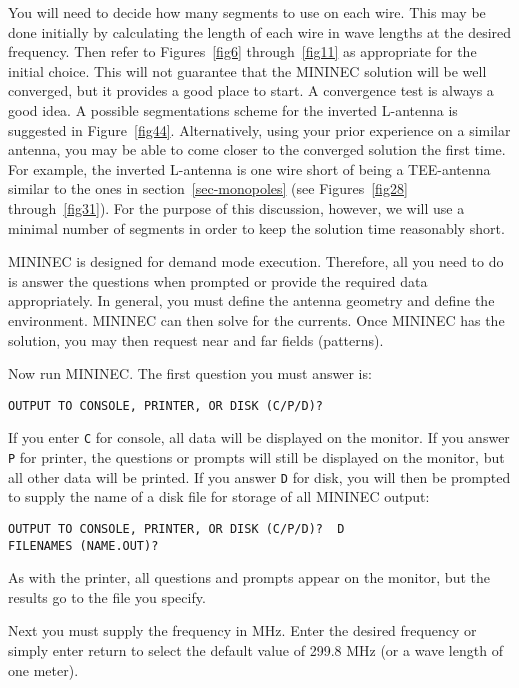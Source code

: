 \documentclass[12pt]{article}
\begin{document}
You will need to decide how many segments to use on each wire. This may
be done initially by calculating the length of each wire in wave lengths
at the desired frequency. Then refer to Figures~\ref{fig6}
through~\ref{fig11} as appropriate for the initial choice. This will not
guarantee that the MININEC solution will be well converged, but it
provides a good place to start. A convergence test is always a good
idea. A possible segmentations scheme for the inverted L-antenna is
suggested in Figure~\ref{fig44}. Alternatively, using your prior
experience on a similar antenna, you may be able to come closer to the
converged solution the first time. For example, the inverted L-antenna
is one wire short of being a TEE-antenna similar to the ones in
section~\ref{sec-monopoles} (see Figures~\ref{fig28} through~\ref{fig31}).
For the purpose of this discussion, however, we will use a minimal
number of segments in order to keep the solution time reasonably short.

MININEC is designed for demand mode execution. Therefore, all you need
to do is answer the questions when prompted or provide the required data
appropriately. In general, you must define the antenna geometry and
define the environment. MININEC can then solve for the currents. Once
MININEC has the solution, you may then request near and far fields
(patterns).

\noindent Now run MININEC. The first question you must answer is:

\begin{Verbatim}
OUTPUT TO CONSOLE, PRINTER, OR DISK (C/P/D)?
\end{Verbatim}

If you enter \verb+C+ for console, all data will be displayed on the
monitor. If you answer \verb+P+ for printer, the questions or prompts
will still be displayed on the monitor, but all other data will be
printed. If you answer \verb+D+ for disk, you will then be prompted to
supply the name of a disk file for storage of all MININEC output:

\begin{Verbatim}
OUTPUT TO CONSOLE, PRINTER, OR DISK (C/P/D)?  D
FILENAMES (NAME.OUT)?
\end{Verbatim}

As with the printer, all questions and prompts appear on the monitor,
but the results go to the file you specify.

Next you must supply the frequency in MHz. Enter the desired frequency
or simply enter return to select the default value of 299.8 MHz (or a
wave length of one meter).
\end{document}
